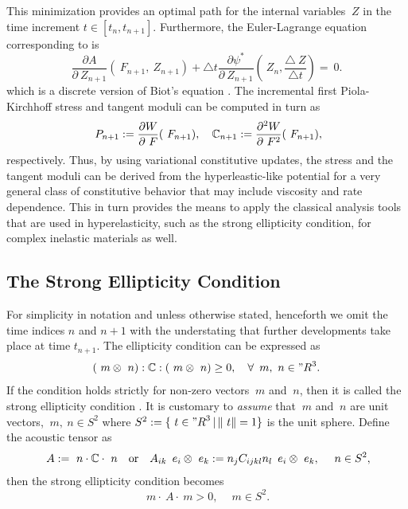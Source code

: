 \documentclass[12pt]{article}
\numberwithin{equation}{section}
\begin{document}
This minimization provides an optimal path for the internal variables
$~Z$ in the time increment $t \in [t_n, t_{n+1}]$. Furthermore, the
Euler-Lagrange equation corresponding to
 is
\begin{equation} \label{eq:Biots-equation-discrete}
  \frac{\partial A}{\partial ~Z_{n+1}}(~F_{n+1}, ~Z_{n+1})
  +
  \triangle t
  \frac{\partial \psi^*}{\partial ~Z_{n+1}}
  \left(~Z_n, \frac{\triangle ~Z}{\triangle t}\right)
  =
  ~0.
\end{equation}
which is a discrete version of Biot's equation
 \citep{Miehe.etal:2002}. The
incremental first Piola-Kirchhoff stress and tangent moduli can be
computed in turn as
\begin{equation} \label{eq:incremental-stress-moduli}
  ~P_{n+1} := \frac{\partial W}{\partial ~F} (~F_{n+1}),
  \quad
  \mathbb{C}_{n+1} := \frac{\partial^2 W}{\partial ~F^2} (~F_{n+1}),
\end{equation}
respectively. Thus, by using variational constitutive updates, the
stress and the tangent moduli can be derived from the
hyperleastic-like potential  for
a very general class of constitutive behavior that may include
viscosity and rate dependence. This in turn provides the means to
apply the classical analysis tools that are used in hyperelasticity,
such as the strong ellipticity condition, for complex inelastic
materials as well.

\subsection{The Strong Ellipticity Condition}

For simplicity in notation and unless otherwise stated, henceforth we
omit the time indices $n$ and $n+1$ with the understating that further
developments take place at time $t_{n+1}$.  The ellipticity condition
can be expressed as
\begin{equation} \label{eq:strong-ellipticity}
  (~m \otimes ~n) : \mathbb{C} : (~m \otimes ~n) \ge 0,
  \quad
  \forall \, ~m, ~n \in {"R}^3.
\end{equation}
If the condition holds strictly for non-zero vectors $~m$ and $~n$,
then it is called the strong ellipticity condition
\citep{Hadamard:1903, Truesdell.Noll:2004, Miehe.etal:2004}. It is
customary to \emph{assume} that $~m$ and $~n$ are unit vectors, \ie
$~m, ~n \in S^2$ where $S^2 := \{ ~t \in {"R}^3 \, | \, \| ~t \| =
1\}$ is the unit sphere. Define the acoustic tensor as
\begin{equation} \label{eq:acoustic-tensor}
  ~A := ~n \cdot \mathbb{C} \cdot ~n
  \quad \text{or} \quad
  A_{ik} \, ~e_i \otimes ~e_k := n_j C_{ijkl} n_l \, ~e_i \otimes ~e_k,
  \quad
  ~n \in S^2,
\end{equation}
then the strong ellipticity condition becomes
\begin{equation} \label{eq:acoustic-ellipticity}
  ~m \cdot ~A \cdot ~m > 0, \quad ~m \in S^2.
\end{equation}
\end{document}
